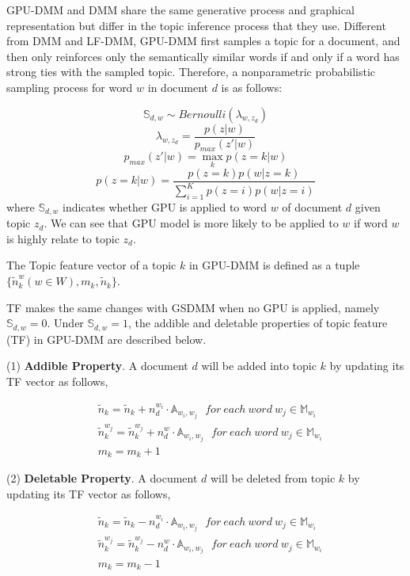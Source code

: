 \documentclass[10pt,journal,compsoc]{IEEEtran}
\begin{document}
GPU-DMM and DMM share the same generative process and graphical representation but differ in the topic inference process that they use. Different from DMM and LF-DMM, GPU-DMM first samples a topic for a document, and then only reinforces only the semantically similar words if and only if a word has strong ties with the sampled topic. Therefore, a nonparametric probabilistic sampling process for word $w$ in document $d$ is as follows:

\begin{equation} \label{gpu}
\mathbb{S}_{d,w} \sim Bernoulli(\lambda_{w,z_d})
\end{equation}
\begin{equation}
\lambda_{w,z_d} = \frac{p(z|w)}{p_{max}(z'|w)}
\end{equation}
\[
p_{max}(z'|w) = \max_kp(z=k|w)
\]
\begin{equation}
p(z=k|w)=\frac{p(z=k)p(w|z=k)}{\sum_{i=1}^Kp(z=i)p(w|z=i)}
\end{equation}
where $\mathbb{S}_{d,w}$ indicates whether GPU is applied to word $w$ of document $d$ given topic $z_d$. We can see that GPU model is more likely to be applied to $w$ if word $w$ is highly relate to topic $z_d$.

The Topic feature vector of a topic $k$ in GPU-DMM is defined as a tuple $\{\widetilde{n}_k^w(w\in W), m_k, \widetilde{n}_k\}$.

TF makes the same changes with GSDMM when no GPU is applied, namely $\mathbb{S}_{d,w}=0$. Under $\mathbb{S}_{d,w}=1$, the addible and deletable properties of topic feature (TF) in GPU-DMM are described below. 

(1) \textbf{Addible Property}. A document $d$ will be added into topic $k$ by updating its TF vector as follows,

\[
\begin{split}
& \widetilde{n}_k = \widetilde{n}_k + n_d^{w_i}\cdot\mathbb{A}_{w_i,w_j} \ \ \  for \  each \ word \ w_j\in\mathbb{M}_{w_i}  \\
& \widetilde{n}_k^{w_j} = \widetilde{n}_k^{w_j} +  n_d^w\cdot\mathbb{A}_{w_i,w_j} \ \ \  for \  each \ word \ w_j\in\mathbb{M}_{w_i}  \\
& m_k = m_k + 1
\end{split}
\]

(2) \textbf{Deletable Property}. A document $d$ will be deleted from topic $k$ by updating its TF vector as follows,

\[
\begin{split}
& \widetilde{n}_k = \widetilde{n}_k - n_d^{w_i}\cdot\mathbb{A}_{w_i,w_j} \ \ \  for \  each \ word \ w_j\in\mathbb{M}_{w_i}  \\
& \widetilde{n}_k^{w_j} = \widetilde{n}_k^{w_j} - n_d^w\cdot\mathbb{A}_{w_i,w_j} \ \ \  for \  each \ word \ w_j\in\mathbb{M}_{w_i}  \\
& m_k = m_k - 1
\end{split}
\]
\end{document}
